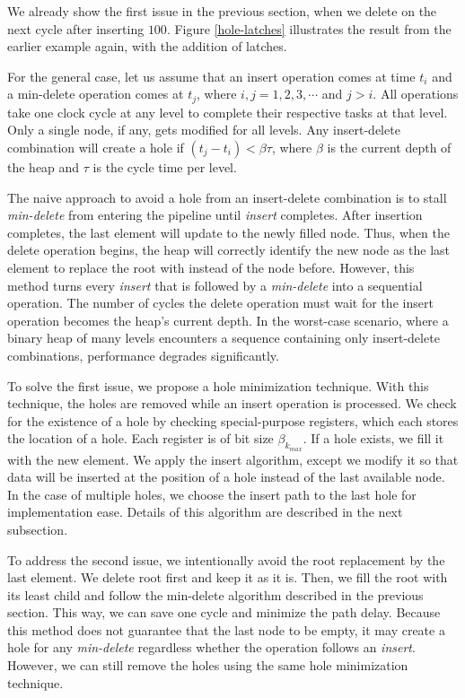 We already show the first issue in the previous section, when we delete on the next cycle after inserting $100$. 
Figure \ref{hole-latches} illustrates the result from the earlier example again, with the addition of latches.

For the general case, let us assume that an insert operation comes at time $t_i$ and a min-delete operation comes at $t_j$, where $i, j = 1,2,3, \cdots$ and $j>i$.
All operations take one clock cycle at any level to complete their respective tasks at that level.
Only a single node, if any, gets modified for all levels.
Any insert-delete combination will create a hole if $(t_j - t_i) < \beta\tau$, where $\beta$ is the current depth of the heap and $\tau$ is the cycle time per level. 

The naive approach to avoid a hole from an insert-delete combination is to stall {\it min-delete} from entering the pipeline until {\it insert} completes.
After insertion completes, the last element will update to the newly filled node.
Thus, when the delete operation begins, the heap will correctly identify the new node as the last element to replace the root with instead of the node before.
However, this method turns every {\it insert} that is followed by a {\it min-delete} into a sequential operation.
The number of cycles the delete operation must wait for the insert operation becomes the heap's current depth. 
In the worst-case scenario, where a binary heap of many levels encounters a sequence containing only insert-delete combinations, performance degrades significantly.

To solve the first issue, we propose a hole minimization technique.
With this technique, the holes are removed while an insert operation is processed.
We check for the existence of a hole by checking special-purpose registers, which each stores the location of a hole. 
Each register is of bit size $\beta_{k_{max}}$.
If a hole exists, we fill it with the new element. 
We apply the insert algorithm, except we modify it so that data will be inserted at the position of a hole instead of the last available node.
In the case of multiple holes, we choose the insert path to the last hole for implementation ease.
Details of this algorithm are described in the next subsection.

To address the second issue, we intentionally avoid the root replacement by the last element.
We delete root first and keep it as it is.
Then, we fill the root with its least child and follow the min-delete algorithm described in the previous section.
This way, we can save one cycle and minimize the path delay.
Because this method does not guarantee that the last node to be empty, it may create a hole for any {\it min-delete} regardless whether the operation follows an {\it insert}. 
However, we can still remove the holes using the same hole minimization technique.

